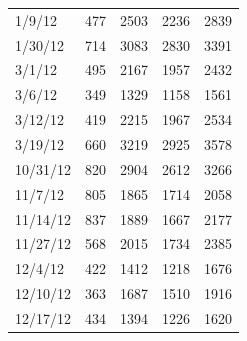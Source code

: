 \begin{landscape}
\begin{table}[htbp]
\begin{tabular}{@{}lllll@{}}
1/9/12      & 477                                    & 2503                                   & 2236                          & 2839                           \\
1/30/12     & 714                                    & 3083                                   & 2830                            & 3391                           \\
3/1/12      & 495                                    & 2167                                   & 1957                           & 2432                            \\
3/6/12      & 349                                    & 1329                                   & 1158                           & 1561                           \\
3/12/12     & 419                                    & 2215                                   & 1967                           & 2534                           \\
3/19/12     & 660                                    & 3219                                   & 2925                           & 3578                           \\
10/31/12    & 820                                    & 2904                                   & 2612                           & 3266                             \\
11/7/12     & 805                                    & 1865                                   & 1714                           & 2058                           \\
11/14/12    & 837                                    & 1889                                   & 1667                           & 2177                           \\
11/27/12    & 568                                    & 2015                                   & 1734                             & 2385                           \\
12/4/12     & 422                                    & 1412                                   & 1218                           & 1676                            \\
12/10/12    & 363                                    & 1687                                   & 1510                           & 1916                           \\
12/17/12    & 434                                    & 1394                                   & 1226                           & 1620                           \\

\end{tabular}
\end{table}
\end{landscape}
